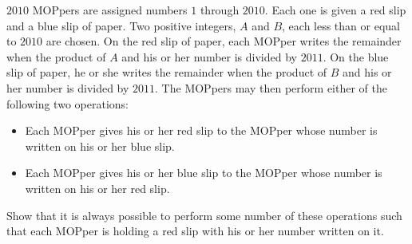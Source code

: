 $2010$ MOPpers are assigned numbers $1$ through $2010$. Each one is given a red slip and a blue slip of paper. Two positive integers, $A$ and $B$, each less than or equal to $2010$ are chosen. On the red slip of paper, each MOPper writes the remainder when the product of $A$ and his or her number is divided by $2011$. On the blue slip of paper, he or she writes the remainder when the product of $B$ and his or her number is divided by $2011$. The MOPpers may then perform either of the following two operations:
\begin{itemize}
	\item Each MOPper gives his or her red slip to the MOPper whose number is written on his or her blue slip.
	\item Each MOPper gives his or her blue slip to the MOPper whose number is written on his or her red slip.
\end{itemize}
Show that it is always possible to perform some number of these operations such that each MOPper is holding a red slip with his or her number written on it.
